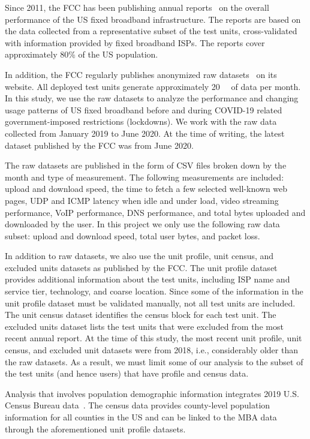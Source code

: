 \documentclass[conference,10pt]{IEEEtran}
\begin{document}
Since 2011, the \gls{FCC} has been publishing annual reports~\cite{mba-studies} on the overall performance of the \gls{US} fixed broadband infrastructure. The reports are based on the data collected from a representative subset of the test units, cross-validated with information provided by fixed broadband \glspl{ISP}. The reports cover approximately 80\% of the \gls{US} population.

In addition, the \gls{FCC} regularly publishes anonymized raw datasets~\cite{data} on its website. All deployed test units generate approximately \SI{20}{\giga\byte} of data per month. In this study, we use the raw datasets to analyze the performance and changing usage patterns of \gls{US} fixed broadband before and during COVID-19 related government-imposed restrictions (lockdowns). We work with the raw data collected from January 2019 to June 2020. At the time of writing, the latest dataset published by the \gls{FCC} was from June 2020.

The raw datasets are published in the form of \gls{CSV} files broken down by the month and type of measurement. The following measurements are included: upload and download speed, the time to fetch a few selected well-known web pages, \gls{UDP} and \gls{ICMP} latency when idle and under load, video streaming performance, \gls{VoIP} performance, \gls{DNS} performance, and total bytes uploaded and downloaded by the user. In this project we only use the following raw data subset: upload and download speed, total user bytes, and packet loss.

In addition to raw datasets, we also use the unit profile, unit census, and excluded units datasets as published by the \gls{FCC}. The unit profile dataset provides additional information about the test units, including \gls{ISP} name and service tier, technology, and coarse location. Since some of the information in the unit profile dataset must be validated manually, not all test units are included. The unit census dataset identifies the census block for each test unit. The excluded units dataset lists the test units that were excluded from the most recent annual report. At the time of this study, the most recent unit profile, unit census, and excluded unit datasets were from 2018, i.e., considerably older than the raw datasets. As a result, we must limit some of our analysis to the subset of the test units (and hence users) that have profile and census data.

Analysis that involves population demographic information integrates 2019 U.S. Census Bureau data~\cite{census}. The census data provides county-level population information for all counties in the \gls{US} and can be linked to the \gls{MBA} data through the aforementioned unit profile datasets.
\end{document}

